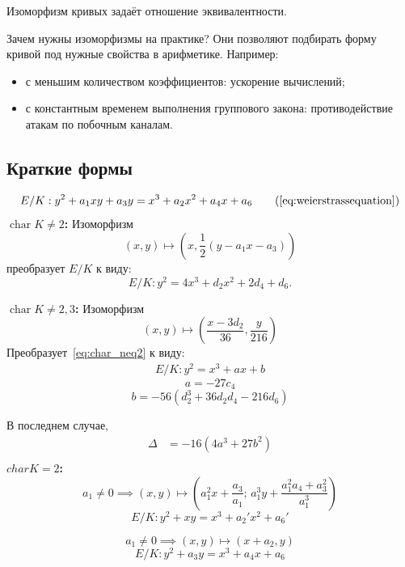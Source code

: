 \documentclass[11pt]{exam}
\theoremstyle{definition}
\begin{document}
{Изоморфизм кривых задаёт отношение эквивалентности.

Зачем нужны изоморфизмы на практике? Они позволяют подбирать форму кривой под нужные свойства в арифметике. Например:
\begin{itemize}
	\item с меньшим количеством коэффициентов: ускорение вычислений;
	\item с константным временем выполнения группового закона: противодействие атакам по побочным каналам.
\end{itemize}

\subsection{Краткие формы}
    \begin{equation*}
	E/K: y^2 + a_1 xy + a_3 y = x^3 + a_2 x^2 + a_4 x + a_6 \tag{\ref{eq:weierstrassequation}}
\end{equation*}
\textbf{$\operatorname{char} K \neq 2$:}
Изоморфизм \[(x, y)\mapsto \left(x, \frac{1}{2}(y-a_1x-a_3)\right)\] преобразует $E/K$ к виду:
\begin{equation}
	\label{eq:char_neq2}
	E/K: y^2 = 4x^3 + d_2x^2 + 2d_4 + d_6.
\end{equation}

\textbf{$\operatorname{char} K \neq 2, 3$:}
Изоморфизм
\[
(x, y) \mapsto \left(\frac{x-3d_2}{36}, \frac{y}{216}\right)
\]
Преобразует~\eqref{eq:char_neq2} к виду:
\begin{align}
	E/K: y^2 = x^3 + ax + b
\end{align}
\[
a = -27 c_4
\]
\[
b = -56(d_2^3 + 36 d_2 d_4 - 216 d_6) 
\]

В последнем случае, 
\begin{align*}
	\Delta &= -16(4a^3 + 27b^2) \\ \nonumber
\end{align*}
\textbf{$char K = 2$:} 
\[
a_1 \neq 0 \implies (x, y) \mapsto \left(a_1^2x+\frac{a_3}{a_1}; \, a_1^3y + \frac{a_1^2a_4+a_3^2}{a_1^3}\right)
\]
\begin{equation}
	E/K: y^2+xy=x^3+a_2'x^2+a_6'
\end{equation}

\[
a_1 \neq 0 \implies (x, y) \mapsto (x+a_2, y)
\]
\begin{equation}
	E/K: y^2+a_3y = x^3+a_4x+a_6
\end{equation}

}
\end{document}
